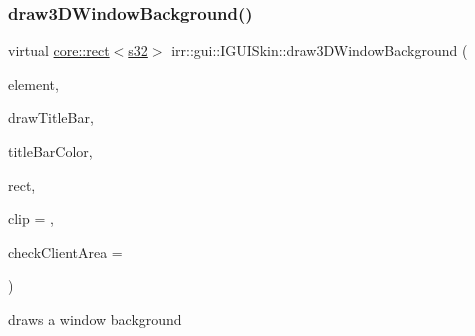 \subsubsection{\texorpdfstring{draw3\+D\+Window\+Background()}{draw3DWindowBackground()}\hspace{0.1cm}{\footnotesize\ttfamily [2/2]}}
{\footnotesize\ttfamily virtual \hyperlink{classirr_1_1core_1_1rect}{core\+::rect}$<$\hyperlink{namespaceirr_ac66849b7a6ed16e30ebede579f9b47c6}{s32}$>$ irr\+::gui\+::\+I\+G\+U\+I\+Skin\+::draw3\+D\+Window\+Background (\begin{DoxyParamCaption}\item[{\hyperlink{classirr_1_1gui_1_1IGUIElement}{I\+G\+U\+I\+Element} $\ast$}]{element,  }\item[{bool}]{draw\+Title\+Bar,  }\item[{\hyperlink{classirr_1_1video_1_1SColor}{video\+::\+S\+Color}}]{title\+Bar\+Color,  }\item[{const \hyperlink{classirr_1_1core_1_1rect}{core\+::rect}$<$ \hyperlink{namespaceirr_ac66849b7a6ed16e30ebede579f9b47c6}{s32} $>$ \&}]{rect,  }\item[{const \hyperlink{classirr_1_1core_1_1rect}{core\+::rect}$<$ \hyperlink{namespaceirr_ac66849b7a6ed16e30ebede579f9b47c6}{s32} $>$ $\ast$}]{clip = {},  }\item[{\hyperlink{classirr_1_1core_1_1rect}{core\+::rect}$<$ \hyperlink{namespaceirr_ac66849b7a6ed16e30ebede579f9b47c6}{s32} $>$ $\ast$}]{check\+Client\+Area = {} }\end{DoxyParamCaption})\hspace{0.3cm}{\ttfamily [pure virtual]}}



draws a window background 

